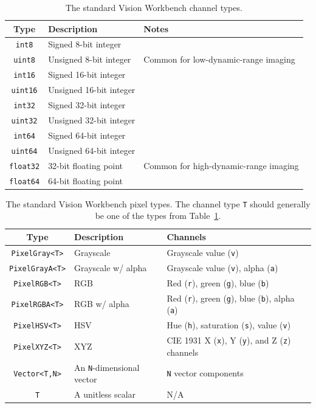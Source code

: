 \begin{table}[t]\begin{centering}
\begin{tabular}{|c|l|l|} \hline
Type & Description & Notes \\ \hline \hline
\verb#int8# & Signed 8-bit integer & \\ \hline
\verb#uint8# & Unsigned 8-bit integer & Common for low-dynamic-range imaging \\ \hline
\verb#int16# & Signed 16-bit integer & \\ \hline
\verb#uint16# & Unsigned 16-bit integer & \\ \hline
\verb#int32# & Signed 32-bit integer & \\ \hline
\verb#uint32# & Unsigned 32-bit integer & \\ \hline
\verb#int64# & Signed 64-bit integer & \\ \hline
\verb#uint64# & Unsigned 64-bit integer & \\ \hline
\verb#float32# & 32-bit floating point & Common for high-dynamic-range imaging \\ \hline
\verb#float64# & 64-bit floating point & \\ \hline
\end{tabular}
\caption{The standard Vision Workbench channel types.}
\label{tbl:channel-types}
\end{centering}\end{table}

\begin{table}[t]\begin{centering}
\begin{tabular}{|c|l|l|} \hline
Type & Description & Channels \\ \hline \hline
\verb#PixelGray<T># & Grayscale & Grayscale value (\verb#v#) \\ \hline
\verb#PixelGrayA<T># & Grayscale w/ alpha & Grayscale value (\verb#v#), alpha (\verb#a#) \\ \hline
\verb#PixelRGB<T># & RGB & Red (\verb#r#), green (\verb#g#), blue (\verb#b#) \\ \hline
\verb#PixelRGBA<T># & RGB w/ alpha &  Red (\verb#r#), green (\verb#g#), blue (\verb#b#), alpha (\verb#a#) \\ \hline
\verb#PixelHSV<T># & HSV & Hue (\verb#h#), saturation (\verb#s#), value (\verb#v#) \\ \hline
\verb#PixelXYZ<T># & XYZ & CIE 1931 X (\verb#x#), Y (\verb#y#), and Z (\verb#z#) channels \\ \hline
\verb#Vector<T,N># & An \verb#N#-dimensional vector & \verb#N# vector components \\ \hline
\verb#T# & A unitless scalar & N/A \\ \hline
\end{tabular}
\caption{The standard Vision Workbench pixel types.  The channel
type {\tt T} should generally be one of the types from Table~\ref{tbl:channel-types}.}
\label{tbl:pixel-types}
\end{centering}\end{table}

